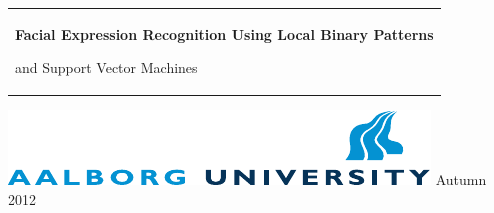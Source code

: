 %
%
%
%
\begin{titlepage}
  \addtolength{\hoffset}{0.5\evensidemargin-0.5\oddsidemargin} %
  \noindent%
  \begin{tabular}{@{}p{\textwidth}@{}}
    \vspace{0.2cm}
    \begin{center}
    \Huge{\textbf{
      Facial Expression Recognition Using Local Binary Patterns%
    }}
    \end{center}
    \begin{center}
      \Large{
        and Support Vector Machines%
      }
    \end{center}
    \vspace{0.2cm}\\
  \end{tabular}
  \vspace{4 cm}
  \vfill
  \noindent \includegraphics{figures/aau_logo_en} \hfill {\large Autumn 2012} \\
  \\
	
\end{titlepage}
\clearpage
